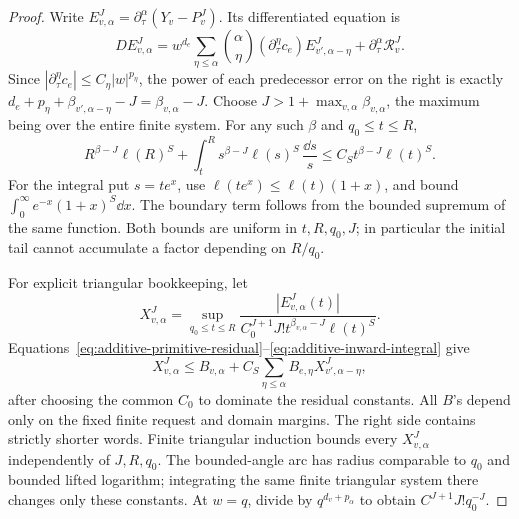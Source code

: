 \begin{proof}
Write $E_{v,\alpha}^J=\partial_\tau^\alpha(Y_v-P_v^J)$.
Its differentiated equation is
\begin{equation}\label{eq:additive-primitive-error-system}
 D E_{v,\alpha}^J
 =w^{d_e}\sum_{\eta\le\alpha}\binom{\alpha}{\eta}
       (\partial_\tau^\eta c_e)E_{v',\alpha-\eta}^J
                   +\partial_\tau^\alpha\mathcal R_v^J.
\end{equation}
Since $|\partial_\tau^\eta c_e|\le C_\eta|w|^{p_\eta}$,
the power of each predecessor error on the right is exactly
$d_e+p_\eta+\beta_{v',\alpha-\eta}-J
=\beta_{v,\alpha}-J$.
Choose $J>1+\max_{v,\alpha}\beta_{v,\alpha}$, the maximum being over
the entire finite system.  For any such $\beta$ and $q_0\le t\le R$,
\begin{equation}\label{eq:additive-inward-integral}
 R^{\beta-J}\ell(R)^S+
 \int_t^R s^{\beta-J}\ell(s)^S\,\frac{\dd s}{s}
 \le C_S t^{\beta-J}\ell(t)^S.
\end{equation}
For the integral put $s=te^x$, use
$\ell(te^x)\le\ell(t)(1+x)$, and bound
$\int_0^\infty e^{-x}(1+x)^S\dd x$.
The boundary term follows from the bounded supremum of the same
function.  Both bounds are uniform in $t,R,q_0,J$; in particular the
initial tail cannot accumulate a factor depending on $R/q_0$.

For explicit triangular bookkeeping, let
\[
 X_{v,\alpha}^J=
 \sup_{q_0\le t\le R}
  \frac{|E_{v,\alpha}^J(t)|}
       {C_0^{J+1}J!t^{\beta_{v,\alpha}-J}\ell(t)^S}.
\]
Equations~\eqref{eq:additive-primitive-residual}--\eqref{eq:additive-inward-integral}
give
\begin{equation}\label{eq:additive-primitive-triangular-bound}
 X_{v,\alpha}^J\le B_{v,\alpha}
       +C_S\sum_{\eta\le\alpha}B_{e,\eta}
                         X_{v',\alpha-\eta}^J,
\end{equation}
after choosing the common $C_0$ to dominate the residual constants.
All $B$'s depend only on the fixed finite request and domain margins.
The right side contains strictly shorter words.  Finite triangular
induction bounds every $X_{v,\alpha}^J$ independently of $J,R,q_0$.
The bounded-angle arc has radius comparable to $q_0$ and bounded lifted
logarithm; integrating the same finite triangular system there changes
only these constants.  At $w=q$, divide by
$q^{d_v+p_\alpha}$ to obtain $C^{J+1}J!q_0^{-J}$.


\end{proof}
